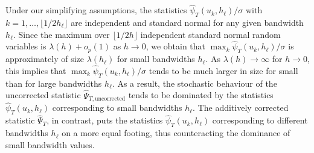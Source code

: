Under our simplifying assumptions, the statistics $\widehat{\psi}_T(u_k,h_\ell)/\sigma$ with $k = 1,\ldots,\lfloor 1/2h_\ell \rfloor$ are independent and standard normal for any given bandwidth $h_\ell$. Since the maximum over $\lfloor 1/2h \rfloor$ independent standard normal random variables is $\lambda(h) + o_p(1)$ as $h \rightarrow 0$, we obtain that $\max_{k} \widehat{\psi}_T(u_k,h_\ell)/\sigma$ is approximately of size $\lambda(h_\ell)$ for small bandwidths $h_\ell$. As $\lambda(h) \rightarrow \infty$ for $h \rightarrow 0$, this implies that $\max_{k} \widehat{\psi}_T(u_k,h_\ell)/\sigma$ tends to be much larger in size for small than for large bandwidths $h_\ell$. As a result, the stochastic behaviour of the uncorrected statistic $\widehat{\Psi}_{T,\text{uncorrected}}$ tends to be dominated by the statistics $\widehat{\psi}_T(u_k,h_\ell)$ corresponding to small bandwidths $h_\ell$. The additively corrected statistic $\widehat{\Psi}_T$, in contrast, puts the statistics $\widehat{\psi}_T(u_k,h_\ell)$ corresponding to different bandwidths $h_\ell$ on a more equal footing, thus counteracting the dominance of small bandwidth values. 


